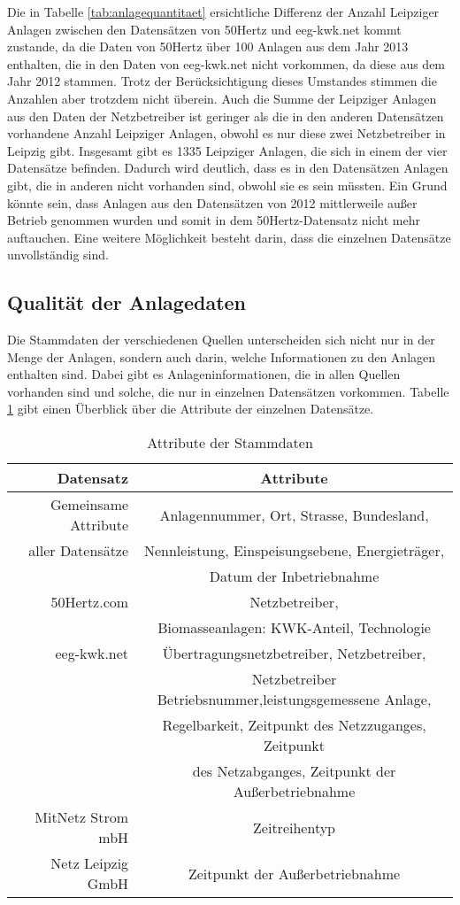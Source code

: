 \documentclass[a4paper,11pt]{article}
\begin{document}
Die in Tabelle \ref{tab:anlagequantitaet} ersichtliche Differenz der Anzahl
Leipziger Anlagen zwischen den Datensätzen von 50Hertz und eeg-kwk.net kommt
zustande, da die Daten von 50Hertz über 100 Anlagen aus dem Jahr 2013
enthalten, die in den Daten von eeg-kwk.net nicht vorkommen, da diese aus dem
Jahr 2012 stammen. Trotz der Berücksichtigung dieses Umstandes stimmen die
Anzahlen aber trotzdem nicht überein. Auch die Summe der Leipziger Anlagen aus
den Daten der Netzbetreiber ist geringer als die in den anderen Datensätzen
vorhandene Anzahl Leipziger Anlagen, obwohl es nur diese zwei Netzbetreiber in
Leipzig gibt. Insgesamt gibt es 1335 Leipziger Anlagen, die sich in einem der
vier Datensätze befinden. Dadurch wird deutlich, dass es in den Datensätzen
Anlagen gibt, die in anderen nicht vorhanden sind, obwohl sie es sein müssten.
Ein Grund könnte sein, dass Anlagen aus den Datensätzen von 2012 mittlerweile
außer Betrieb genommen wurden und somit in dem 50Hertz-Datensatz nicht mehr
auftauchen. Eine weitere Möglichkeit besteht darin, dass die einzelnen
Datensätze unvollständig sind.

\subsection{Qualität der Anlagedaten}

Die Stammdaten der verschiedenen Quellen unterscheiden sich nicht nur in der
Menge der Anlagen, sondern auch darin, welche Informationen zu den Anlagen
enthalten sind. Dabei gibt es Anlageninformationen, die in allen Quellen
vorhanden sind und solche, die nur in einzelnen Datensätzen vorkommen. Tabelle
\ref{tab:attribs} gibt einen Überblick über die Attribute der einzelnen
Datensätze.

\begin{table}[ht]
\centering
\begin{tabular}[h]{r|c}
Datensatz & Attribute\\\hline
Gemeinsame Attribute & Anlagennummer, Ort, Strasse, Bundesland, \\
aller Datensätze & Nennleistung, Einspeisungsebene, Energieträger, \\
 & Datum der Inbetriebnahme  \\\hline
50Hertz.com & Netzbetreiber, \\
 & Biomasseanlagen: KWK-Anteil, Technologie \\\hline
eeg-kwk.net & Übertragungsnetzbetreiber, Netzbetreiber, \\
 & Netzbetreiber Betriebsnummer,leistungsgemessene Anlage, \\
 & Regelbarkeit, Zeitpunkt des Netzzuganges, Zeitpunkt \\
 & des Netzabganges, Zeitpunkt der Außerbetriebnahme \\\hline
MitNetz Strom mbH & Zeitreihentyp \\\hline
Netz Leipzig GmbH & Zeitpunkt der Außerbetriebnahme  \\
\end{tabular}
\caption{Attribute der Stammdaten}
\label{tab:attribs}
\end{table}
\end{document}
